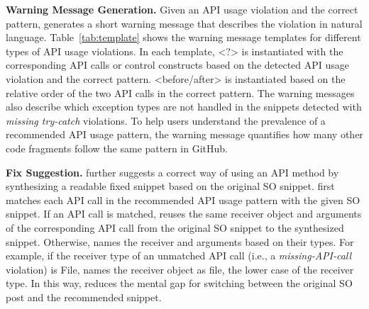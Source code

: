 {\bf Warning Message Generation.} Given an API usage violation and the correct pattern, {\tool} generates a short warning message that describes the violation in natural language. Table~\ref{tab:template} shows the warning message templates for different types of API usage violations. In each template, {\textless?\textgreater} is instantiated with the corresponding API calls or control constructs based on the detected API usage violation and the correct pattern. {\textless before/after\textgreater} is instantiated based on the relative order of the two API calls in the correct pattern. The warning messages also describe which exception types are not handled in the snippets detected with {\em missing try-catch} violations. To help users understand the prevalence of a recommended API usage pattern, the warning message quantifies how many other code fragments follow the same pattern in GitHub. 

{\bf Fix Suggestion.} {\tool} further suggests a correct way of using an API method by synthesizing a readable fixed snippet based on the original SO snippet. {\tool} first matches each API call in the recommended API usage pattern with the given SO snippet. If an API call is matched, {\tool} reuses the same receiver object and arguments of the corresponding API call from the original SO snippet to the synthesized snippet. Otherwise, {\tool} names the receiver and arguments based on their types. For example, if the receiver type of an unmatched API call (i.e., a {\em missing-API-call} violation) is {\ttt File}, {\tool} names the receiver object as {\ttt file}, the lower case of the receiver type. In this way, {\tool} reduces the mental gap for switching between the original SO post and the recommended snippet.

